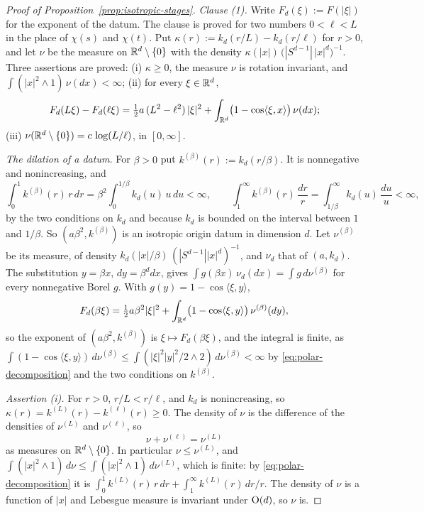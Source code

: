 \begin{proof}[Proof of Proposition~\ref{prop:isotropic-stages}]
\emph{Clause (1).} Write $F_d(\xi) := F(|\xi|)$ for the exponent of the datum. The clause is
proved for two numbers $0 < \ell < L$ in the place of $\chi(s)$ and $\chi(t)$. Put
$\kappa(r) := k_d(r/L) - k_d(r/\ell)$ for $r > 0$, and let $\nu$ be the measure on
$\mathbb{R}^d \setminus \{0\}$ with the density $\kappa(|x|)\,\bigl(|S^{d-1}|\,|x|^d\bigr)^{-1}$. Three
assertions are proved: (i) $\kappa \ge 0$, the measure $\nu$ is rotation invariant, and
$\int(|x|^2 \wedge 1)\,\nu(dx) < \infty$; (ii) for every $\xi \in \mathbb{R}^d$,
\[
  F_d(L\xi) - F_d(\ell\xi) = \tfrac12 a\,(L^2 - \ell^2)\,|\xi|^2
     + \int_{\mathbb{R}^d}\bigl(1 - \cos\langle\xi,x\rangle\bigr)\,\nu(dx) ;
\]
(iii) $\nu(\mathbb{R}^d \setminus \{0\}) = c\,\log(L/\ell)$, in $[0,\infty]$.

\emph{The dilation of a datum.} For $\beta > 0$ put $k^{(\beta)}(r) := k_d(r/\beta)$. It is
nonnegative and nonincreasing, and
\[
  \int_0^1 k^{(\beta)}(r)\,r\,dr = \beta^2\int_0^{1/\beta}k_d(u)\,u\,du < \infty, \qquad
  \int_1^\infty k^{(\beta)}(r)\,\frac{dr}{r} = \int_{1/\beta}^\infty k_d(u)\,\frac{du}{u} < \infty ,
\]
by the two conditions on $k_d$ and because $k_d$ is bounded on the interval between $1$ and
$1/\beta$. So $(a\beta^2, k^{(\beta)})$ is an isotropic origin datum in dimension $d$. Let
$\nu^{(\beta)}$ be its \Levy{} measure, of density $k_d(|x|/\beta)\,(|S^{d-1}||x|^d)^{-1}$, and
$\nu_d$ that of $(a,k_d)$. The substitution $y = \beta x$, $dy = \beta^d dx$, gives
$\int g(\beta x)\,\nu_d(dx) = \int g\,d\nu^{(\beta)}$ for every nonnegative Borel $g$. With
$g(y) = 1 - \cos\langle\xi,y\rangle$,
\begin{equation}\label{eq:dilated-exponent}
  F_d(\beta\xi) = \tfrac12 a\beta^2|\xi|^2
     + \int_{\mathbb{R}^d}\bigl(1 - \cos\langle\xi,y\rangle\bigr)\,\nu^{(\beta)}(dy) ,
\end{equation}
so the exponent of $(a\beta^2, k^{(\beta)})$ is $\xi \mapsto F_d(\beta\xi)$, and the integral is
finite, as $\int(1 - \cos\langle\xi,y\rangle)\,d\nu^{(\beta)}
\le \int(|\xi|^2|y|^2/2 \wedge 2)\,d\nu^{(\beta)} < \infty$ by \ref{eq:polar-decomposition} and
the two conditions on $k^{(\beta)}$.

\emph{Assertion (i).} For $r > 0$, $r/L < r/\ell$, and $k_d$ is nonincreasing, so
$\kappa(r) = k^{(L)}(r) - k^{(\ell)}(r) \ge 0$. The density of $\nu$ is the difference of the
densities of $\nu^{(L)}$ and $\nu^{(\ell)}$, so
\begin{equation}\label{eq:stage-measure-sum}
  \nu + \nu^{(\ell)} = \nu^{(L)}
\end{equation}
as measures on $\mathbb{R}^d \setminus \{0\}$. In particular $\nu \le \nu^{(L)}$, and
$\int(|x|^2 \wedge 1)\,d\nu \le \int(|x|^2 \wedge 1)\,d\nu^{(L)}$, which is finite: by
\ref{eq:polar-decomposition} it is $\int_0^1 k^{(L)}(r)\,r\,dr + \int_1^\infty k^{(L)}(r)\,dr/r$.
The density of $\nu$ is a function of $|x|$ and Lebesgue measure is invariant under
$\mathrm{O}(d)$, so $\nu$ is.


\end{proof}

